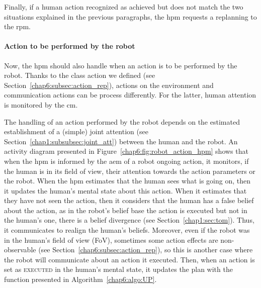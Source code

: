 \documentclass[a4paper,11pt,twoside]{StyleThese}
\begin{document}
Finally, if a human action recognized as achieved but does not match the two situations explained in the previous paragraphs, the \acrshort{hpm} requests a replanning to the \acrshort{rpm}.


\paragraph{Action to be performed by the robot} Now, the \acrshort{hpm} should also handle when an action is to be performed by the robot. Thanks to the class action we defined (see Section~\ref{chap6:subsec:action_rep}), actions on the environment and communication actions can be process differently. For the latter, human attention is monitored by the \acrlong{cm}. 

The handling of an action performed by the robot depends on the estimated establishment of a (simple) joint attention (see Section~\ref{chap1:subsubsec:joint_att}) between the human and the robot. An activity diagram presented in Figure~\ref{chap6:fig:robot_action_hpm} shows that when the \acrshort{hpm} is informed by the \acrfull{aem} of a robot ongoing action, it monitors, if the human is in its field of view, their attention towards the action parameters or the robot. When the \acrshort{hpm} estimates that the human sees what is going on, then it updates the human's mental state about this action. When it estimates that they have not seen the action, then it considers that the human has a false belief about the action, as in the robot's belief base the action is executed but not in the human's one, there is a belief divergence (see Section~\ref{chap1:sec:tom}). Thus, it communicates to realign the human's beliefs. Moreover, even if the robot was in the human's field of view (FoV), sometimes some action effects are non-observable (see Section~\ref{chap6:subsec:action_rep}), so this is another case where the robot will communicate about an action it executed. Then, when an action is set as \textsc{executed} in the human's mental state, it updates the plan with the function presented in Algorithm~\ref{chap6:algo:UP}.
\end{document}

